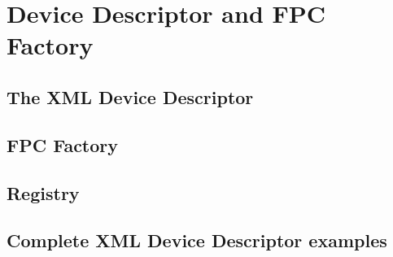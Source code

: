 \section{Device Descriptor and FPC Factory}

\subsection{The XML Device Descriptor}

\subsection{FPC Factory}

\subsection{Registry}

\subsection{Complete XML Device Descriptor examples}